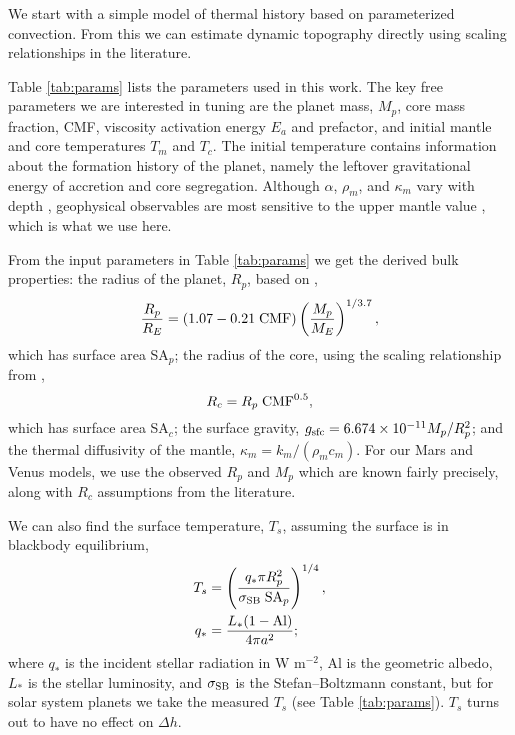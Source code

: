 We start with a simple model of thermal history based on parameterized convection. From this we can estimate dynamic topography directly using scaling relationships in the literature.

Table \ref{tab:params} lists the parameters used in this work. The key free parameters we are interested in tuning are the planet mass, $M_p$, core mass fraction, CMF, viscosity activation energy $E_a$ and prefactor, and initial mantle and core temperatures $T_m$ and $T_c$. The initial temperature contains information about the formation history of the planet, namely the leftover gravitational energy of accretion and core segregation. Although $\alpha$, $\rho_m$, and $\kappa_m$ vary with depth \citep{Anderson1987}, geophysical observables are most sensitive to the upper mantle value \citep{Kiefer1992}, which is what we use here.

From the input parameters in Table \ref{tab:params} we get the derived bulk properties: the radius of the planet, $R_p$, based on \citet{Zeng2016},
\begin{equation}
\frac{R_p}{R_E} = (1.07 - 0.21\; {\rm CMF})\left(\frac{M_p}{M_E}\right)^{1/3.7},
\end{equation}
which has surface area SA$_p$; the radius of the core, using the scaling relationship from \citet{Zeng2017},
\begin{equation}
R_c = R_p \; {\rm CMF}^{0.5},
\end{equation}
which has surface area SA$_c$; the surface gravity, $g_{\rm sfc} = 6.674\times 10^{-11}M_p/R_p^2$; and the thermal diffusivity of the mantle, $\kappa_m = k_m/(\rho_m c_m)$. For our Mars and Venus models, we use the observed $R_p$ and $M_p$ which are known fairly precisely, along with $R_c$ assumptions from the literature. 


We can also find the surface temperature, $T_s$, assuming the surface is in blackbody equilibrium,
\begin{align}
T_s &= \left(\frac{q_* \pi R_p^2}{\sigma_{\rm SB} \; {\rm SA}_p}\right)^{1/4},\\
q_* &= \frac{L_*(1-{\rm Al})}{4 \pi a^2};
\end{align}
where $q_*$ is the incident stellar radiation in W m$^{-2}$, Al is the geometric albedo, $L_*$ is the stellar luminosity, and $\sigma_{\rm SB}$ is the Stefan–Boltzmann constant, but for solar system planets we take the measured $T_s$ (see Table \ref{tab:params}). $T_s$ turns out to have no effect on $\Delta h$.




